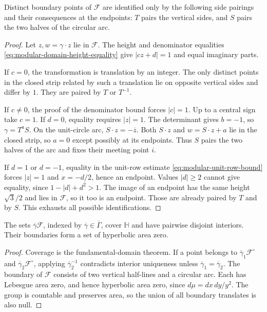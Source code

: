 \begin{proposition}\label{modular.boundary-identifications}
Distinct boundary points of $\mathcal F$ are identified only by the following side pairings and their consequences at the endpoints: $T$ pairs the vertical sides, and $S$ pairs the two halves of the circular arc.
\end{proposition}

\begin{proof}
Let $z,w=\gamma\cdot z$ lie in $\mathcal F$. The height and denominator equalities \eqref{eq:modular-domain-height-equality} give $|cz+d|=1$ and equal imaginary parts.

If $c=0$, the transformation is translation by an integer. The only distinct points in the closed strip related by such a translation lie on opposite vertical sides and differ by $1$. They are paired by $T$ or $T^{-1}$.

If $c\ne0$, the proof of the denominator bound forces $|c|=1$. Up to a central sign take $c=1$. If $d=0$, equality requires $|z|=1$. The determinant gives $b=-1$, so $\gamma=T^aS$. On the unit-circle arc, $S\cdot z=-\overline z$. Both $S\cdot z$ and $w=S\cdot z+a$ lie in the closed strip, so $a=0$ except possibly at its endpoints. Thus $S$ pairs the two halves of the arc and fixes their meeting point $i$.

If $d=1$ or $d=-1$, equality in the unit-row estimate \eqref{eq:modular-unit-row-bound} forces $|z|=1$ and $x=-d/2$, hence an endpoint. Values $|d|\geq2$ cannot give equality, since $1-|d|+d^2>1$. The image of an endpoint has the same height $\sqrt3/2$ and lies in $\mathcal F$, so it too is an endpoint. Those are already paired by $T$ and by $S$. This exhausts all possible identifications.
\end{proof}

\begin{corollary}\label{modular.tiling}
The sets $\overline\gamma\mathcal F$, indexed by $\overline\gamma\in\overline\Gamma$, cover $\mathbb H$ and have pairwise disjoint interiors. Their boundaries form a set of hyperbolic area zero.
\end{corollary}

\begin{proof}
Coverage is the fundamental-domain theorem. If a point belongs to $\overline\gamma_1\mathcal F^\circ$ and $\overline\gamma_2\mathcal F^\circ$, applying $\overline\gamma_2^{-1}$ contradicts interior uniqueness unless $\overline\gamma_1=\overline\gamma_2$. The boundary of $\mathcal F$ consists of two vertical half-lines and a circular arc. Each has Lebesgue area zero, and hence hyperbolic area zero, since $d\mu=dx\,dy/y^2$. The group is countable and preserves area, so the union of all boundary translates is also null.
\end{proof}

